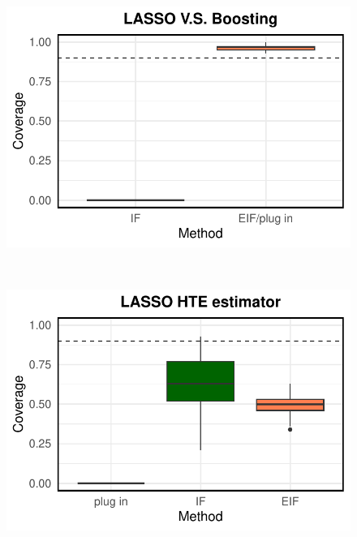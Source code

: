 \documentclass{article}
\theoremstyle{plain}
\theoremstyle{definition}
\theoremstyle{plain}
\begin{document}
\begin{figure}[h]
\begin{minipage}{0.3\textwidth}
                \includegraphics[clip, trim = 0cm 0cm 0cm 0cm, width = \textwidth]{plot/simulation_true_coverage_LASSO_V.S._Boosting.pdf}
        \end{minipage}       
        \\         
        \begin{minipage}{0.3\textwidth}
                \centering
                \includegraphics[clip, trim = 0cm 0cm 0cm 0cm, width = \textwidth]{plot/simulation_linear_coverage_LASSO.pdf}
        \end{minipage}
        \begin{minipage}{0.3\textwidth}
                \centering

\end{minipage}
\end{figure}
\end{document}
